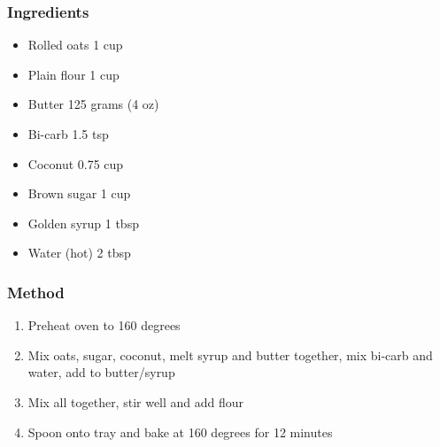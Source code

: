\documentclass[]{article}
\begin{document}
\subsubsection*{\Large Ingredients}
\begin{multicols}{2}
\begin{itemize}
 \item Rolled oats \hfill 1 cup
 \item Plain flour \hfill 1 cup
 \item Butter \hfill 125 grams (4 oz)
 \item Bi-carb \hfill 1.5 tsp
 \item Coconut \hfill 0.75 cup
 \item Brown sugar \hfill 1 cup
 \item Golden syrup \hfill 1 tbsp
 \item Water (hot) \hfill 2 tbsp
\end{itemize}
\end{multicols}
\subsubsection*{\Large Method}
\begin{enumerate}[font=\huge\color{accent}]
	\item Preheat oven to 160 degrees
	\item Mix oats, sugar, coconut, melt syrup and butter together, mix bi-carb and water, add to butter/syrup
	\item Mix all together, stir well and add flour
	\item Spoon onto tray and bake at 160 degrees for 12 minutes
\end{enumerate}
\newpage
{}\label{rec:Choc Chip Biscuits}
\end{document}
